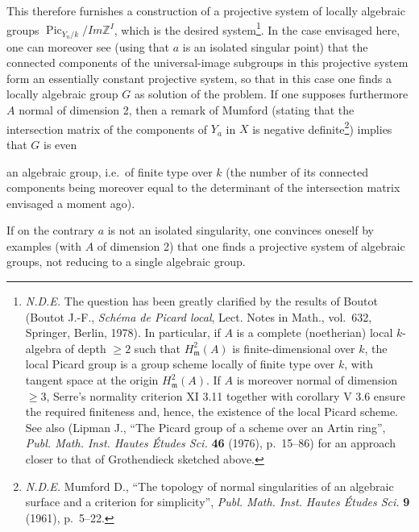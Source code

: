 \documentclass[
  11pt,
  a4paper,
]{book}
\begin{document}
This therefore furnishes a construction of a projective system of
locally algebraic groups \(\operatorname{Pic}_{Y_{n}/k}
/ Im \mathbb{Z}^{I}\), which is the desired system\footnote{\emph{N.D.E.}
  The question has been greatly clarified by the results of Boutot
  (Boutot J.-F., \emph{Schéma de Picard local}, Lect. Notes in Math.,
  vol.~632, Springer, Berlin, 1978). In particular, if \(A\) is a
  complete (noetherian) local \(k\)-algebra of depth \(\geqslant 2\)
  such that \(H^{2}_{\mathfrak{m}}(A)\) is finite-dimensional over
  \(k\), the local Picard group is a group scheme locally of finite type
  over \(k\), with tangent space at the origin
  \(H^{2}_{\mathfrak{m}}(A)\). If \(A\) is moreover normal of dimension
  \(\geqslant 3\), Serre's normality criterion XI 3.11 together with
  corollary V 3.6 ensure the required finiteness and, hence, the
  existence of the local Picard scheme. See also (Lipman J., ``The
  Picard group of a scheme over an Artin ring'', \emph{Publ. Math. Inst.
  Hautes Études Sci.} \textbf{46} (1976), p.~15--86) for an approach
  closer to that of Grothendieck sketched above.}. In the case envisaged
here, one can moreover see (using that \(a\) is an isolated singular
point) that the connected components of the universal-image subgroups in
this projective system form an essentially constant projective system,
so that in this case one finds a locally algebraic group \(G\) as
solution of the problem. If one supposes furthermore \(A\) normal of
dimension 2, then a remark of Mumford (stating that the intersection
matrix of the components of \(Y_{a}\) in \(X\) is negative
definite\footnote{\emph{N.D.E.} Mumford D., ``The topology of normal
  singularities of an algebraic surface and a criterion for
  simplicity'', \emph{Publ. Math. Inst. Hautes Études Sci.} \textbf{9}
  (1961), p.~5--22.}) implies that \(G\) is even

an algebraic group, i.e.~of finite type over \(k\) (the number of its
connected components being moreover equal to the determinant of the
intersection matrix envisaged a moment ago).

If on the contrary \(a\) is not an isolated singularity, one convinces
oneself by examples (with \(A\) of dimension 2) that one finds a
projective system of algebraic groups, not reducing to a single
algebraic group.
\end{document}
